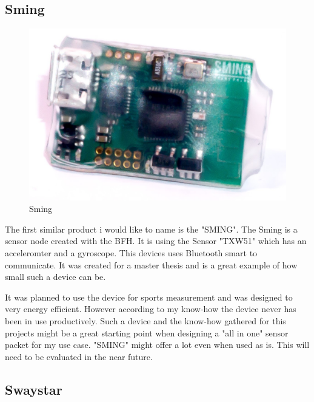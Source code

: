 \subsection{Sming}

\begin{figure}
  \begin{center}
\includegraphics[width=\linewidth]{images/sming_pic2.jpg}
  \end{center}
  \caption{\label{fig:Sming}Sming \cite{sming:book}}
\end{figure}

The first similar product i would like to name is the "SMING". The Sming is a sensor node created with the BFH. 
It is using the Sensor "TXW51" which has an acceleromter and a gyroscope. This devices uses Bluetooth smart to communicate. It was created for a master thesis and is a great example of how small such a device can be. 

It was planned to use the device for sports measurement and was designed to very energy efficient. However according to my know-how the device never has been in use productively. \cite{sming:book}
Such a device and the know-how gathered for this projects might be a great starting point when designing a "all in one" sensor packet for my use case. "SMING" might offer a lot even when used as is. This will need to be evaluated in the near future.

\newpage
\subsection{Swaystar}

